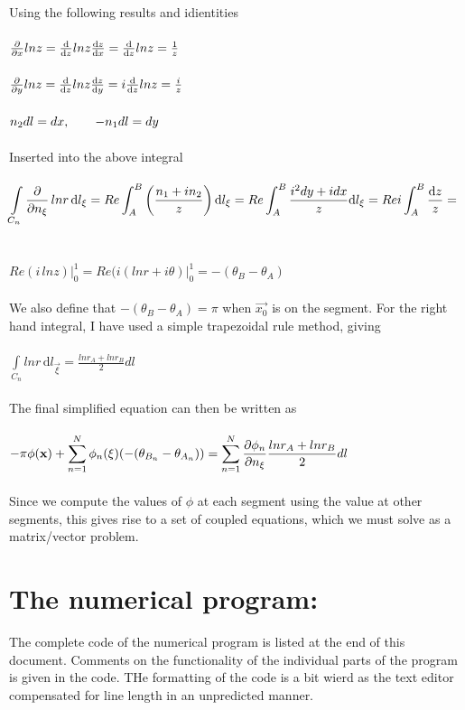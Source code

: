 \documentclass[a4paper,english,11pt,twoside]{article}
\newcommand{\tab}{\hspace*{2em}}
\begin{document}
\\
Using the following results and idientities\\
\\
$\frac{\partial }{\partial x}lnz = \frac{\mathrm d}{\mathrm d z}lnz\frac{\mathrm d z}{\mathrm d x} = \frac{\mathrm d}{\mathrm d z}lnz = \frac{1}{z}$\\
\\
$\frac{\partial }{\partial y}lnz = \frac{\mathrm d}{\mathrm d z}lnz\frac{\mathrm d z}{\mathrm d y} = i\frac{\mathrm d}{\mathrm d z}lnz = \frac{i}{z}$\\
\\
$n_2dl = dx,\tab -n_1dl = dy$
\\
\\
Inserted into the above integral\\
\\
$\displaystyle\int\limits_{C_n}\frac{\partial }{\partial n_{\mathbf{\xi}}}\, lnr\, \mathrm{d}l_{\mathbf{\xi}} = Re\displaystyle\int_A^B\left(\frac{n_1 + in_2}{z}\right) \mathrm{d}l_{\mathbf{\xi}} = Re\displaystyle\int_A^B\frac{i^2dy + idx}{z} \mathrm{d}l_{\mathbf{\xi}} = Re i\displaystyle\int_A^B\frac{\mathrm d z}{z} = $\\
\\
\\
$Re(i\, lnz)\big|_0^1 = Re(i(lnr + i\theta)\big|_0^1 = -(\theta_B - \theta_A)$\\
\\We also define that $-(\theta_B - \theta_A)=\pi$ when $\vec{x_0}$ is on the segment.
\newpage
For the right hand integral, I have used a simple trapezoidal rule method, giving\\
\\
$\int\limits_{C_n} lnr\, \mathrm{d}l_{\vec{\xi}} = \frac{lnr_A + lnr_B}{2}dl$\\
\\
The final simplified equation can then be written as\\
\\
$-\pi\phi(\mathbf{x}) +\displaystyle\displaystyle\sum_{n=1}^{N}\phi_n(\mathbf{\xi})(-(\theta_{B_n} - \theta_{A_n})) = \displaystyle\displaystyle\sum_{n=1}^{N}\frac{\partial \phi_n}{\partial n_{\mathbf{\xi}}}\frac{lnr_A + lnr_B}{2}dl$\\
\\
Since we compute the values of $\phi$ at each segment using the value at other segments, this gives rise to a set of coupled equations, which we must solve as a matrix/vector problem.
\section*{The numerical program:}
The complete code of the numerical program is listed at the end of this document. Comments on the functionality of the individual parts of the program is given in the code. THe formatting of the code is a bit wierd as the text editor compensated for line length in an unpredicted manner.\\
\end{document}
